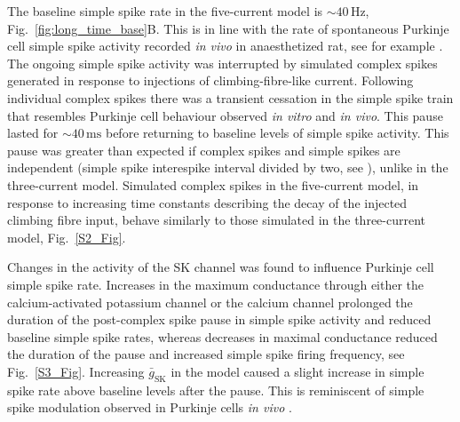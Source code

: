 \documentclass[utf8]{frontiersSCNS} %
\newcommand{\mse}{\,\mathrm{ms}}
\newcommand{\hz}{\,\mathrm{Hz}}
\newcommand{\sk}{\mathrm{SK}}
\begin{document}
The baseline simple spike rate in the five-current model is $\sim
40\hz$, Fig.~\ref{fig:long_time_base}B. This is in line with the rate
of spontaneous Purkinje cell simple spike activity recorded \textit{in
  vivo} in anaesthetized rat, see for example \cite{BurroughsEtAl2016}.  The ongoing simple spike activity was interrupted by simulated complex spikes generated in response to injections of
climbing-fibre-like current. Following individual complex spikes there
was a transient cessation in the simple spike train that resembles
Purkinje cell behaviour observed \textit{in vitro} and \textit{in
  vivo}. This pause lasted for $\sim 40\mse$ before returning to
baseline levels of simple spike activity. This pause was greater than
expected if complex spikes and simple spikes are independent (simple
spike interespike interval divided by two, see \cite{XiaoEtAl2014}),
unlike in the three-current model. Simulated complex spikes in the
five-current model, in response to increasing time constants
describing the decay of the injected climbing fibre input, behave
similarly to those simulated in the three-current model,
Fig.~\ref{S2_Fig}.



Changes in the activity of the SK channel was found to influence
Purkinje cell simple spike rate. Increases in the maximum conductance
through either the calcium-activated potassium channel or the calcium
channel prolonged the duration of the post-complex spike pause in
simple spike activity and reduced baseline simple spike rates, whereas
decreases in maximal conductance reduced the duration of the pause and
increased simple spike firing frequency, see
Fig.~\ref{S3_Fig}. Increasing $\bar{g}_\sk$ in the model caused a
slight increase in simple spike rate above baseline levels after the
pause. This is reminiscent of simple spike modulation observed in
Purkinje cells \textsl{in vivo} \cite{BurroughsEtAl2016}.
\end{document}
